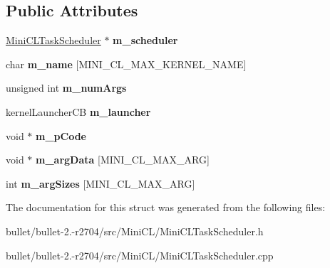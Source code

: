 \subsection*{Public Attributes}
\begin{DoxyCompactItemize}
\item 
\hypertarget{struct_mini_c_l_kernel_a7fedd236642dd640ff94c501acfca0ff}{\hyperlink{class_mini_c_l_task_scheduler}{Mini\+C\+L\+Task\+Scheduler} $\ast$ {\bfseries m\+\_\+scheduler}}\label{struct_mini_c_l_kernel_a7fedd236642dd640ff94c501acfca0ff}

\item 
\hypertarget{struct_mini_c_l_kernel_a35a38cd78391f05a0f15bd40580b5cd2}{char {\bfseries m\+\_\+name} \mbox{[}M\+I\+N\+I\+\_\+\+C\+L\+\_\+\+M\+A\+X\+\_\+\+K\+E\+R\+N\+E\+L\+\_\+\+N\+A\+M\+E\mbox{]}}\label{struct_mini_c_l_kernel_a35a38cd78391f05a0f15bd40580b5cd2}

\item 
\hypertarget{struct_mini_c_l_kernel_abdcd66ae9066265f9409a74ab549fe2d}{unsigned int {\bfseries m\+\_\+num\+Args}}\label{struct_mini_c_l_kernel_abdcd66ae9066265f9409a74ab549fe2d}

\item 
\hypertarget{struct_mini_c_l_kernel_aa7162b26a29f94f5abfaa5aa1d079478}{kernel\+Launcher\+C\+B {\bfseries m\+\_\+launcher}}\label{struct_mini_c_l_kernel_aa7162b26a29f94f5abfaa5aa1d079478}

\item 
\hypertarget{struct_mini_c_l_kernel_a615ecc109d67bf9342a411e5c67debf1}{void $\ast$ {\bfseries m\+\_\+p\+Code}}\label{struct_mini_c_l_kernel_a615ecc109d67bf9342a411e5c67debf1}

\item 
\hypertarget{struct_mini_c_l_kernel_aa04e2365eaf038fdce2f9658312c1f27}{void $\ast$ {\bfseries m\+\_\+arg\+Data} \mbox{[}M\+I\+N\+I\+\_\+\+C\+L\+\_\+\+M\+A\+X\+\_\+\+A\+R\+G\mbox{]}}\label{struct_mini_c_l_kernel_aa04e2365eaf038fdce2f9658312c1f27}

\item 
\hypertarget{struct_mini_c_l_kernel_a1ce5d0ddfd384e7bdc1d1a8ceeadd1a5}{int {\bfseries m\+\_\+arg\+Sizes} \mbox{[}M\+I\+N\+I\+\_\+\+C\+L\+\_\+\+M\+A\+X\+\_\+\+A\+R\+G\mbox{]}}\label{struct_mini_c_l_kernel_a1ce5d0ddfd384e7bdc1d1a8ceeadd1a5}

\end{DoxyCompactItemize}


The documentation for this struct was generated from the following files\+:\begin{DoxyCompactItemize}
\item 
bullet/bullet-\/2.-\/r2704/src/\+Mini\+C\+L/Mini\+C\+L\+Task\+Scheduler.\+h\item 
bullet/bullet-\/2.-\/r2704/src/\+Mini\+C\+L/Mini\+C\+L\+Task\+Scheduler.\+cpp\end{DoxyCompactItemize}
